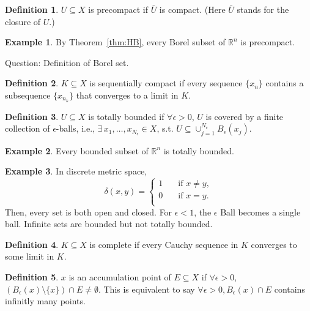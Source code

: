 \documentclass[12pt]{article}
\theoremstyle{plain}
\theoremstyle{definition}
\newtheorem*{defn}{Definition}
\newtheorem*{eg}{Example}
\begin{document}
\begin{defn}
    $U\subseteq X$ is precompact if $\bar{U}$ is compact. (Here $\bar{U}$ stands
    for the closure of $U$.)
\end{defn}

\begin{eg}
    By Theorem~\ref{thm:HB}, every Borel subset of $\mathbb{R}^n$ is precompact.
\end{eg}
Question: Definition of Borel set.

\begin{defn}
    $K\subseteq X$ is sequentially compact if every sequence $\{x_n\}$ contains
    a subsequence $\{x_{n_k}\}$ that converges to a limit in $K$.
\end{defn}

\begin{defn}
    $U\subseteq{X}$ is totally bounded if $\forall \epsilon>0$, $U$ is covered
    by a finite collection of $\epsilon$-balls, i.e.,
    $\exists\,x_1,\ldots,x_{N_\epsilon}\in X$, s.t.
    $U\subseteq\cup_{j=1}^{N_\epsilon}
    B_{\epsilon}(x_j)$.
\end{defn}
\begin{eg}
    Every bounded subset of $\mathbb{R}^n$ is totally bounded.
\end{eg}
\begin{eg}
    In discrete metric space,
    $$\delta(x,y)=
    \left\{
        \begin{aligned}
            1\quad&\text{if }x\neq y,\\
            0\quad&\text{if }x= y.\\
        \end{aligned}
    \right.$$
    Then, every set is both open and closed.
    For $\epsilon<1$, the $\epsilon$ Ball becomes a single ball.
    Infinite sets are bounded but not totally bounded.
\end{eg}

\begin{defn}
    $K\subseteq X$ is complete if every Cauchy sequence in $K$ converges to
    some limit in $K$.
\end{defn}

\begin{defn}
    $x$ is an accumulation point of $E\subseteq X$ if $\forall \epsilon>0$,
    $(B_{\epsilon}(x)\setminus\{x\})\cap E\neq \emptyset$.
    This is equivalent to say $\forall \epsilon > 0, B_{\epsilon}(x)\cap E$
    contains infinitly many points.
\end{defn}
\end{document}
